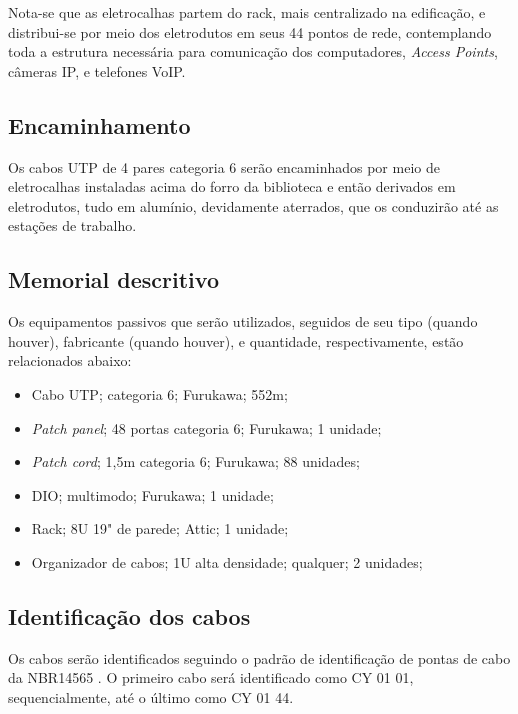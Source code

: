 \documentclass[	DIV=calc,%
							paper=a4,%
							fontsize=12pt,%
							onecolumn]{scrartcl}	 					%
\begin{document}
Nota-se que as eletrocalhas partem do rack, mais centralizado na edificação, e distribui-se por meio dos eletrodutos em seus 44 pontos de rede, contemplando toda a estrutura necessária para comunicação dos computadores, \textit{Access Points}, câmeras IP, e telefones VoIP.

\subsection{Encaminhamento}
Os cabos UTP de 4 pares categoria 6 serão encaminhados por meio de eletrocalhas instaladas acima do forro da biblioteca e então derivados em eletrodutos, tudo em alumínio, devidamente aterrados, que os conduzirão até as estações de trabalho.

\subsection{Memorial descritivo}

Os equipamentos passivos que serão utilizados, seguidos de seu tipo (quando houver), fabricante (quando houver), e quantidade, respectivamente, estão relacionados abaixo:

\begin{itemize}
	\item Cabo UTP; categoria 6; Furukawa; 552m;
	\item \textit{Patch panel}; 48 portas categoria 6; Furukawa; 1 unidade;
	\item \textit{Patch cord}; 1,5m categoria 6; Furukawa; 88 unidades;
	\item DIO; multimodo; Furukawa; 1 unidade;
	\item Rack; 8U 19" de parede; Attic; 1 unidade;
	\item Organizador de cabos; 1U alta densidade; qualquer; 2 unidades;
\end{itemize}

\subsection{Identificação dos cabos}
Os cabos serão identificados seguindo o padrão de identificação de pontas de cabo da NBR14565 \cite{nbr}. O primeiro cabo será identificado como CY 01 01, sequencialmente, até o último como CY 01 44. 	
\end{document}
